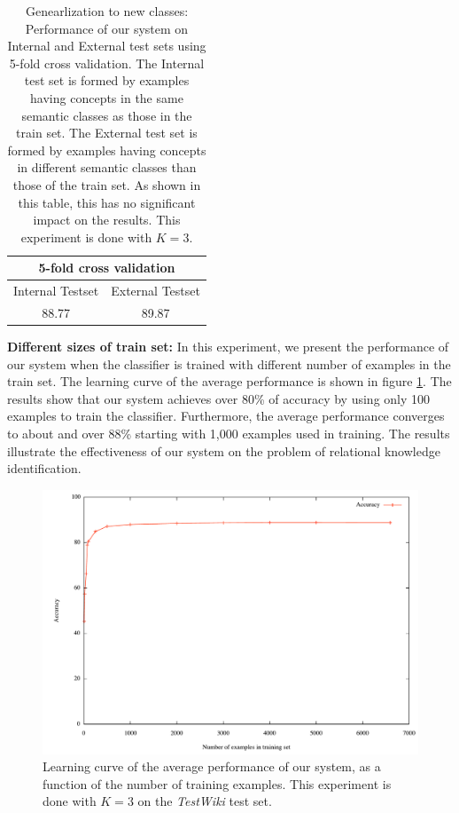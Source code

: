 \begin{table}[h]
\begin{center}
\begin{tabular}{|c|c|}
\hline
\multicolumn{2}{|c|}{5-fold cross validation} \\
\hline
\hline
Internal Testset & External Testset \\
\hline
88.77 & 89.87 \\
\hline
\end{tabular}
\end{center}
\caption{Genearlization to new classes: Performance of our system on Internal and External test sets using
  5-fold cross validation. The Internal test set is formed by examples having concepts in the same semantic classes as
  those in the train set. The External test set is formed by
  examples having concepts in different semantic classes than those of the train set.
  As shown in this table, this has no significant impact on the results. This experiment is done with $K=3$.}
\label{tab:exp-inter-exter}
\end{table}

\vspace*{2 mm}

{\bf Different sizes of train set:} In this experiment, we present the
performance of our system when the classifier is trained with
different number of examples in the train set. The learning curve of
the average performance is shown in figure
\ref{fig:diff-train-size}. The results show that our system achieves
over 80\% of accuracy by using only 100 examples to train the
classifier. Furthermore, the average performance converges to about
and over 88\% starting with 1,000 examples used in training. The
results illustrate the effectiveness of our system on the problem of
relational knowledge identification.

\begin{figure}[htp]
\centering
\includegraphics[totalheight=0.25\textheight]{DiffTrainSizes}
\caption{Learning curve of the average performance of our system, as a
  function of the number of training examples. This experiment is done
  with $K=3$ on the {\em TestWiki} test set.}
\label{fig:diff-train-size}
\end{figure}

